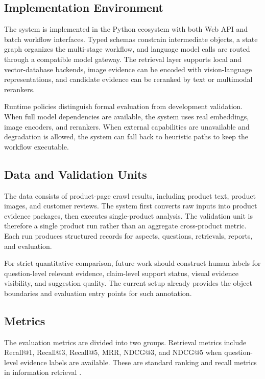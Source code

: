 \documentclass[11pt]{article}
\begin{document}
\subsection{Implementation Environment}

The system is implemented in the Python ecosystem with both Web API and batch workflow interfaces. Typed schemas constrain intermediate objects, a state graph organizes the multi-stage workflow, and language model calls are routed through a compatible model gateway. The retrieval layer supports local and vector-database backends, image evidence can be encoded with vision-language representations, and candidate evidence can be reranked by text or multimodal rerankers.

Runtime policies distinguish formal evaluation from development validation. When full model dependencies are available, the system uses real embeddings, image encoders, and rerankers. When external capabilities are unavailable and degradation is allowed, the system can fall back to heuristic paths to keep the workflow executable.

\subsection{Data and Validation Units}

The data consists of product-page crawl results, including product text, product images, and customer reviews. The system first converts raw inputs into product evidence packages, then executes single-product analysis. The validation unit is therefore a single product run rather than an aggregate cross-product metric. Each run produces structured records for aspects, questions, retrievals, reports, and evaluation.

For strict quantitative comparison, future work should construct human labels for question-level relevant evidence, claim-level support status, visual evidence visibility, and suggestion quality. The current setup already provides the object boundaries and evaluation entry points for such annotation.

\subsection{Metrics}

The evaluation metrics are divided into two groups. Retrieval metrics include Recall@1, Recall@3, Recall@5, MRR, NDCG@3, and NDCG@5 when question-level evidence labels are available. These are standard ranking and recall metrics in information retrieval \citep{manning2008introductionIr}.
\end{document}
